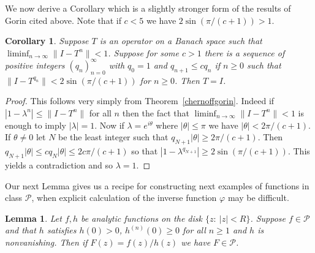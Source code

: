 \documentclass[12pt]{amsart}
\newtheorem{lemma}[thm]{Lemma}
\newtheorem{cor}[thm]{Corollary}
\begin{document}
We now derive a Corollary which is a slightly stronger form of the
results of Gorin cited above.  Note that if $c<5$ we have
$2\sin({\pi}/{(c+1)})>1$.


\begin{cor}\label{chernoffgorin2} Suppose $T$ is an operator on a Banach
space such that $\liminf_{n\to\infty}\|I-T^n\|<1$.  Suppose  for
some $c>1$ there is a sequence of positive integers $(q_n)_{n=0}^{\infty}$ with $q_0=1$
and $q_{n+1}\le cq_n$  if $n\ge 0$ such that $\|I-T^{q_n}\|<
2\sin({\pi}/{(c+1)})$ for $n\ge 0$.  Then $T=I$.\end{cor}


\begin{proof} This follows very simply from
Theorem~\ref{chernoffgorin}.
 Indeed if $|1-\lambda^n|\le \|I-T^n\|$ for all $n$ then the fact
 that $\liminf_{n\to\infty}\|I-T^n\|<1$ is enough to imply
 $|\lambda|=1$.  Now if $\lambda=e^{i\theta}$ where $|\theta|\le \pi$ we have
 $|\theta|<2\pi/(c+1)$.  If $\theta\neq 0$ let $N$ be the least integer such that
 $q_{N+1}|\theta|\ge 2\pi/(c+1)$.  Then $q_{N+1}|\theta|\le cq_N|\theta|\le 2c\pi/(c+1)$ so that
 $|1-\lambda^{q_{N+1}}|\ge 2\sin(\pi/(c+1))$.  This yields a contradiction and so $\lambda=1$.
\end{proof}




Our next Lemma gives us a recipe for constructing next examples of
functions in class $\mathcal P$, when explicit calculation of the
inverse function $\varphi$ may be difficult.


\begin{lemma}\label{newfunctions}  Let $f,h$ be analytic functions on the disk $\{z:\
|z|<R\}$.  Suppose $f\in\mathcal P$ and that
  $h$ satisfies $h(0)>0$, $h^{(n)}(0)\ge 0$ for all $n\ge 1$ and $h$ is
nonvanishing.  Then if $F(z)=f(z)/h(z)$ we have $F\in\mathcal
P$.\end{lemma}
\end{document}
